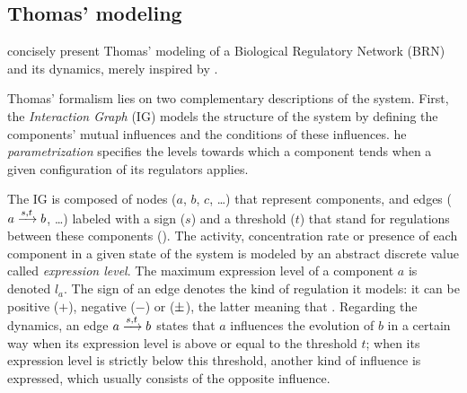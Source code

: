\subsection{Thomas' modeling}
\label{ssec:thomas}



 concisely present Thomas' modeling of a Biological Regulatory Network (BRN) and its dynamics, merely inspired by
\cite{thomas1990biological, Richard06,BernotSemBRN}.

\medskip

Thomas' formalism lies on two complementary descriptions of the system. First, the
\emph{Interaction Graph} (IG) models the structure of the system by defining the components'
mutual influences and the conditions of these influences. he \emph{parametrization}  specifies the levels towards which a component tends when a given configuration of its regulators applies.

The IG is composed of nodes ($a$, $b$, $c$, …) that represent components,
and edges ($a \xrightarrow{s, t} b$, …) labeled with a sign ($s$) and a threshold ($t$) that stand for regulations between these components ().
The activity, concentration rate or presence of each component in a given state of the system is modeled by an abstract discrete value called \emph{expression level}.
The maximum expression level of a component $a$ is denoted $l_a$.
The sign of an edge denotes the kind of regulation it models: it can be positive
($+$), negative ($-$) or  ($\pm$),
the latter meaning that .
Regarding the dynamics, an edge $a \xrightarrow{s, t} b$ states that $a$ influences the evolution of $b$ in a certain way when its expression level is above or equal to the threshold $t$;
when its expression level is strictly below this threshold, another kind of influence is expressed, which usually consists of the opposite influence.

